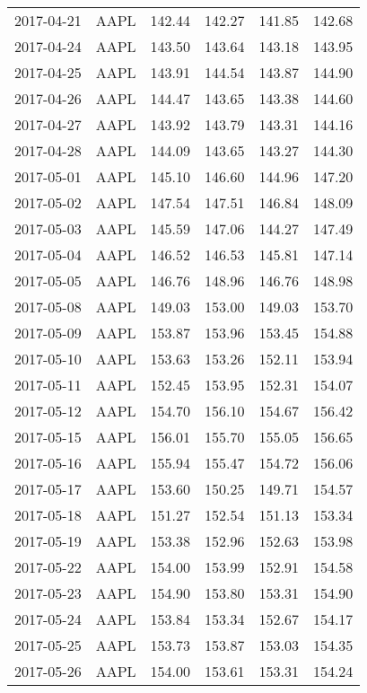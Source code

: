 \documentclass[a4paper, 12pt]{report}
\begin{document}
\begin{appendices}
\begin{longtable}{llllll}
  2017-04-21 & AAPL & 142.44 & 142.27 & 141.85 & 142.68 \\ 
  2017-04-24 & AAPL & 143.50 & 143.64 & 143.18 & 143.95 \\ 
  2017-04-25 & AAPL & 143.91 & 144.54 & 143.87 & 144.90 \\ 
  2017-04-26 & AAPL & 144.47 & 143.65 & 143.38 & 144.60 \\ 
  2017-04-27 & AAPL & 143.92 & 143.79 & 143.31 & 144.16 \\ 
  2017-04-28 & AAPL & 144.09 & 143.65 & 143.27 & 144.30 \\ 
  2017-05-01 & AAPL & 145.10 & 146.60 & 144.96 & 147.20 \\ 
  2017-05-02 & AAPL & 147.54 & 147.51 & 146.84 & 148.09 \\ 
  2017-05-03 & AAPL & 145.59 & 147.06 & 144.27 & 147.49 \\ 
  2017-05-04 & AAPL & 146.52 & 146.53 & 145.81 & 147.14 \\ 
  2017-05-05 & AAPL & 146.76 & 148.96 & 146.76 & 148.98 \\ 
  2017-05-08 & AAPL & 149.03 & 153.00 & 149.03 & 153.70 \\ 
  2017-05-09 & AAPL & 153.87 & 153.96 & 153.45 & 154.88 \\ 
  2017-05-10 & AAPL & 153.63 & 153.26 & 152.11 & 153.94 \\ 
  2017-05-11 & AAPL & 152.45 & 153.95 & 152.31 & 154.07 \\ 
  2017-05-12 & AAPL & 154.70 & 156.10 & 154.67 & 156.42 \\ 
  2017-05-15 & AAPL & 156.01 & 155.70 & 155.05 & 156.65 \\ 
  2017-05-16 & AAPL & 155.94 & 155.47 & 154.72 & 156.06 \\ 
  2017-05-17 & AAPL & 153.60 & 150.25 & 149.71 & 154.57 \\ 
  2017-05-18 & AAPL & 151.27 & 152.54 & 151.13 & 153.34 \\ 
  2017-05-19 & AAPL & 153.38 & 152.96 & 152.63 & 153.98 \\ 
  2017-05-22 & AAPL & 154.00 & 153.99 & 152.91 & 154.58 \\ 
  2017-05-23 & AAPL & 154.90 & 153.80 & 153.31 & 154.90 \\ 
  2017-05-24 & AAPL & 153.84 & 153.34 & 152.67 & 154.17 \\ 
  2017-05-25 & AAPL & 153.73 & 153.87 & 153.03 & 154.35 \\ 
  2017-05-26 & AAPL & 154.00 & 153.61 & 153.31 & 154.24 \\ 

\end{longtable}
\end{appendices}
\end{document}
